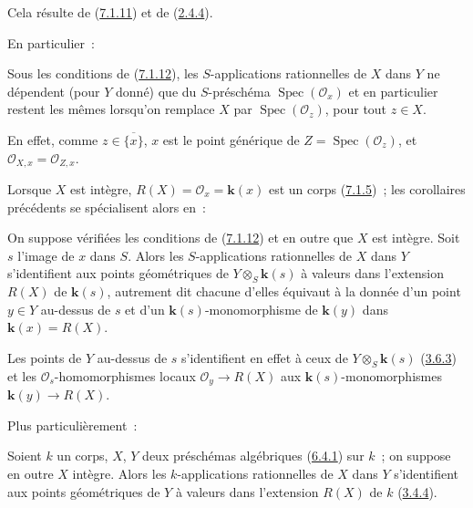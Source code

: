 Cela résulte de (\hyperref[I.7.1.11-fr]{7.1.11}) et de
(\hyperref[I.2.4.4-fr]{2.4.4}).

En particulier~:

\begin{corollary}[7.1.14]
\label{I.7.1.14-fr}
Sous les conditions de \textup{(\hyperref[I.7.1.12-fr]{7.1.12})}, les $S$-applications
rationnelles de $X$ dans $Y$ ne dépendent (pour $Y$ donné) que du
$S$-préschéma $\operatorname{Spec}(\mathscr{O}_x)$ et en particulier restent
les mêmes lorsqu'on remplace $X$ par
$\operatorname{Spec}(\mathscr{O}_z)$, pour tout $z\in X$.
\end{corollary}

En effet, comme $z\in\overline{\{x\}}$, $x$ est le point générique de
$Z=\operatorname{Spec}(\mathscr{O}_z)$, et
$\mathscr{O}_{X,x}=\mathscr{O}_{Z,x}$.

Lorsque $X$ est intègre, $R(X)=\mathscr{O}_x=\boldsymbol{k}(x)$ est un corps
(\hyperref[I.7.1.5-fr]{7.1.5})~; les corollaires précédents se spécialisent
alors en~:

\begin{corollary}[7.1.15]
\label{I.7.1.15-fr}
On suppose vérifiées les conditions de \textup{(\hyperref[I.7.1.12-fr]{7.1.12})} et en
outre que $X$ est intègre. Soit $s$ l'image de $x$ dans $S$. Alors les
$S$-applications rationnelles de $X$ dans $Y$ s'identifient aux points
géométriques de $Y\otimes_S \boldsymbol{k}(s)$ à valeurs dans l'extension $R(X)$ de $\boldsymbol{k}(s)$,
autrement dit chacune d'elles équivaut à la donnée d'un point $y\in Y$
au-dessus de $s$ et d'un $\boldsymbol{k}(s)$-monomorphisme de $\boldsymbol{k}(y)$ dans
$\boldsymbol{k}(x)=R(X)$.
\end{corollary}

Les points de $Y$ au-dessus de $s$ s'identifient en effet à ceux de
$Y\otimes_S \boldsymbol{k}(s)$ (\hyperref[I.3.6.3-fr]{3.6.3}) et les
$\mathscr{O}_s$-homomorphismes locaux $\mathscr{O}_y\to R(X)$ aux
$\boldsymbol{k}(s)$-monomorphismes $\boldsymbol{k}(y)\to R(X)$.

Plus particulièrement~:

\begin{corollary}[7.1.16]
\label{I.7.1.16-fr}
Soient $k$ un corps, $X$, $Y$ deux préschémas algébriques
\textup{(\hyperref[I.6.4.1-fr]{6.4.1})} sur $k$~; on suppose en outre $X$ intègre. Alors
les $k$-applications rationnelles de $X$ dans $Y$ s'identifient aux points
géométriques de $Y$ à valeurs dans l'extension $R(X)$ de $k$
\textup{(\hyperref[I.3.4.4-fr]{3.4.4})}.
\end{corollary}

